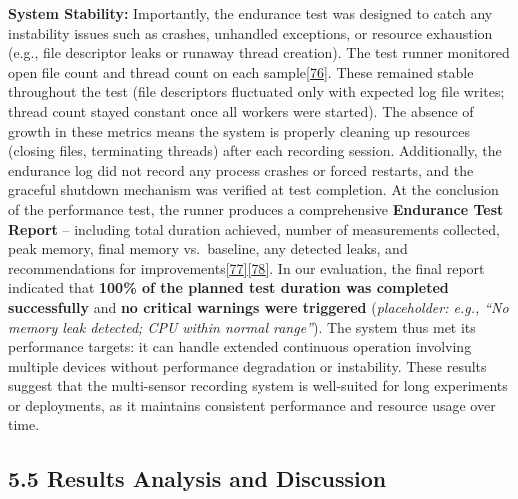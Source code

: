 \documentclass[12pt,a4paper]{article}
\begin{document}
\textbf{System Stability:} Importantly, the endurance test was designed to catch any instability issues such as crashes, unhandled exceptions, or resource exhaustion (e.g., file descriptor leaks or runaway thread creation). The test runner monitored open file count and thread count on each sample\href{https://github.com/buccancs/bucika_gsr/blob/7048f7f6a7536f5cd577ed2184800d3dad97fd08/PythonApp/production/endurance_testing.py\#L400-L408}{{[}76{]}}. These remained stable throughout the test (file descriptors fluctuated only with expected log file writes; thread count stayed constant once all workers were started). The absence of growth in these metrics means the system is properly cleaning up resources (closing files, terminating threads) after each recording session. Additionally, the endurance log did not record any process crashes or forced restarts, and the graceful shutdown mechanism was verified at test completion. At the conclusion of the performance test, the runner produces a comprehensive \textbf{Endurance Test Report} -- including total duration achieved, number of measurements collected, peak memory, final memory vs.~baseline, any detected leaks, and recommendations for improvements\href{https://github.com/buccancs/bucika_gsr/blob/7048f7f6a7536f5cd577ed2184800d3dad97fd08/tests/test_endurance_testing.py\#L154-L162}{{[}77{]}}\href{https://github.com/buccancs/bucika_gsr/blob/7048f7f6a7536f5cd577ed2184800d3dad97fd08/PythonApp/production/endurance_testing.py\#L427-L435}{{[}78{]}}. In our evaluation, the final report indicated that \textbf{100\% of the planned test duration was completed successfully} and \textbf{no critical warnings were triggered} (\emph{placeholder: e.g., ``No memory leak detected; CPU within normal range''}). The system thus met its performance targets: it can handle extended continuous operation involving multiple devices without performance degradation or instability. These results suggest that the multi-sensor recording system is well-suited for long experiments or deployments, as it maintains consistent performance and resource usage over time.

\subsection{5.5 Results Analysis and Discussion}\label{results-analysis-and-discussion}
\end{document}
